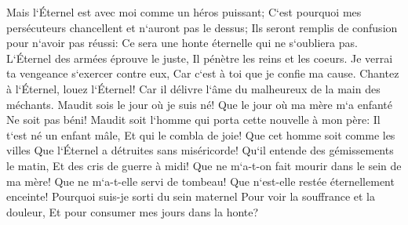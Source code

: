 \verse Mais l`Éternel est avec moi comme un héros puissant; C`est pourquoi mes persécuteurs chancellent et n`auront pas le dessus; Ils seront remplis de confusion pour n`avoir pas réussi: Ce sera une honte éternelle qui ne s`oubliera pas. 
\verse L`Éternel des armées éprouve le juste, Il pénètre les reins et les coeurs. Je verrai ta vengeance s`exercer contre eux, Car c`est à toi que je confie ma cause. 
\verse Chantez à l`Éternel, louez l`Éternel! Car il délivre l`âme du malheureux de la main des méchants. 
\verse Maudit sois le jour où je suis né! Que le jour où ma mère m`a enfanté Ne soit pas béni! 
\verse Maudit soit l`homme qui porta cette nouvelle à mon père: Il t`est né un enfant mâle, Et qui le combla de joie! 
\verse Que cet homme soit comme les villes Que l`Éternel a détruites sans miséricorde! Qu`il entende des gémissements le matin, Et des cris de guerre à midi! 
\verse Que ne m`a-t-on fait mourir dans le sein de ma mère! Que ne m`a-t-elle servi de tombeau! Que n`est-elle restée éternellement enceinte! 
\verse Pourquoi suis-je sorti du sein maternel Pour voir la souffrance et la douleur, Et pour consumer mes jours dans la honte? 


